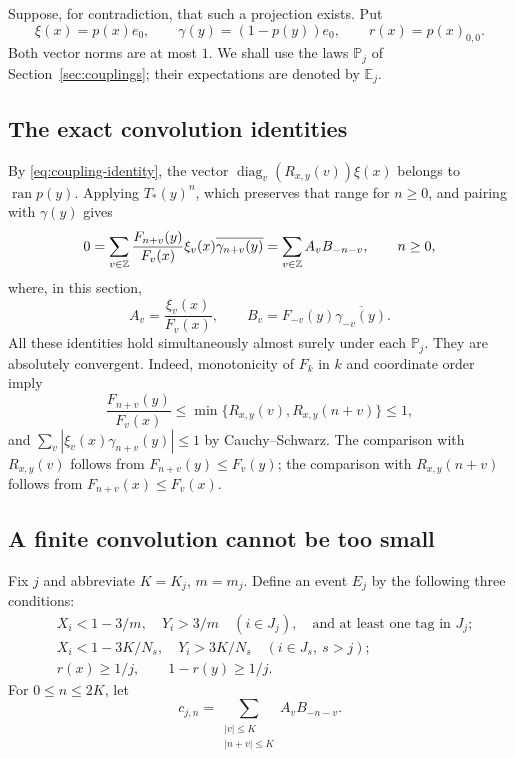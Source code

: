 Suppose, for contradiction, that such a projection exists. Put
\[
 \xi(x)=p(x)e_0,\qquad \gamma(y)=(1-p(y))e_0,
 \qquad r(x)=p(x)_{0,0}.
\]
Both vector norms are at most $1$. We shall use the laws $\mathbb P_j$
of Section~\ref{sec:couplings}; their expectations are denoted by
$\mathbb E_j$.

\subsection{The exact convolution identities}

By \eqref{eq:coupling-identity}, the vector
$\operatorname{diag}_v(R_{x,y}(v))\xi(x)$ belongs to $\operatorname{ran}p(y)$.
Applying $T_*(y)^n$, which preserves that range for $n\ge0$, and pairing
with $\gamma(y)$ gives
\begin{equation}\label{eq:full-convolution}
 0=\sum_{v\in\mathbb Z}\frac{F_{n+v}(y)}{F_v(x)}
       \xi_v(x)\overline{\gamma_{n+v}(y)}
   =\sum_{v\in\mathbb Z} A_vB_{-n-v},\qquad n\ge0,
\end{equation}
where, in this section,
\[
 A_v=\frac{\xi_v(x)}{F_v(x)},\qquad
 B_v=F_{-v}(y)\overline{\gamma_{-v}(y)}.
\]
All these identities hold simultaneously almost surely under each
$\mathbb P_j$. They are absolutely convergent. Indeed, monotonicity of
$F_k$ in $k$ and coordinate order imply
\begin{equation}\label{eq:ratio-minimum}
 \frac{F_{n+v}(y)}{F_v(x)}
 \le\min\{R_{x,y}(v),R_{x,y}(n+v)\}\le1,
\end{equation}
and $\sum_v|\xi_v(x)\gamma_{n+v}(y)|\le1$ by Cauchy--Schwarz.
The comparison with $R_{x,y}(v)$ follows from
$F_{n+v}(y)\le F_v(y)$; the comparison with $R_{x,y}(n+v)$ follows
from $F_{n+v}(x)\le F_v(x)$.

\subsection{A finite convolution cannot be too small}

Fix $j$ and abbreviate $K=K_j$, $m=m_j$. Define an event $E_j$ by the
following three conditions:
\begin{align*}
 &X_i<1-3/m,\quad Y_i>3/m\quad(i\in J_j),
       \quad\text{and at least one tag in }J_j;\\
 &X_i<1-3K/N_s,\quad Y_i>3K/N_s
       \quad(i\in J_s,\ s>j);\\
 &r(x)\ge1/j,\qquad 1-r(y)\ge1/j.
\end{align*}
For $0\le n\le2K$, let
\begin{equation}\label{eq:truncated-convolution}
 c_{j,n}=\sum_{\substack{|v|\le K\\ |n+v|\le K}}A_vB_{-n-v}.
\end{equation}

